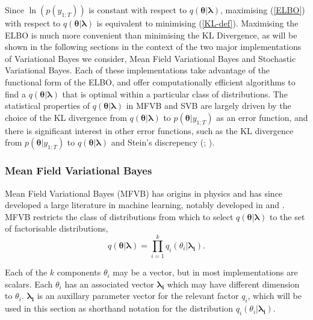 \documentclass[12pt,a4paper]{article}%
\numberwithin{equation}{section}
\begin{document}
Since $\ln(p(y_{1:T}))$ is constant with respect to $q(\boldsymbol{\theta} | \boldsymbol{\lambda})$, maximising (\ref{ELBO}) with respect to $q(\boldsymbol{\theta} | \boldsymbol{\lambda})$ is equivalent to minimising (\ref{KL-def}). Maximising the ELBO is much more convenient than minimising the KL Divergence, as will be shown in the following sections in the context of the two major implementations of Variational Bayes we consider, Mean Field Variational Bayes and Stochastic Variational Bayes. Each of these implementations take advantage of the functional form of the ELBO, and offer computationally efficient algorithms to find a $q(\boldsymbol{\theta} | \boldsymbol{\lambda})$ that is optimal within a particular class of distributions. The statistical properties of $q(\boldsymbol{\theta} | \boldsymbol{\lambda})$ in MFVB and SVB are largely driven by the choice of the KL divergence from $q(\boldsymbol{\theta} | \boldsymbol{\lambda})$ to $p(\boldsymbol{\theta} | y_{1:T})$ as an error function, and there is significant interest in other error functions, such as the KL divergence from $p(\boldsymbol{\theta} | y_{1:T})$ to $q(\boldsymbol{\theta} | \boldsymbol{\lambda})$ \citep{Minka2001} and Stein's discrepency (\citealp{Liu2016}; \citealp{Ranganath2016b}).

\subsubsection{Mean Field Variational Bayes} \label{sec:mfvb}

Mean Field Variational Bayes (MFVB) has origins in physics \citep{Peterson1987} and has since developed a large literature in machine learning, notably developed in \citet{Jordan1999} and \citet{Ghahramani2000}. MFVB restricts the class of distributions from which to select $q(\boldsymbol{\theta} | \boldsymbol{\lambda})$ to the set of factorisable distributions,
\begin{equation}
\label{mf1}
q(\boldsymbol{\theta} | \boldsymbol{\lambda}) = \prod_{i=1}^k q_i(\theta_i | \boldsymbol{\lambda_i}).
\end{equation}

Each of the $k$ components $\theta_i$ may be a vector, but in most implementations are scalars. Each $\theta_i$ has an associated vector $\boldsymbol{\lambda_i}$ which may have different dimension to $\theta_i$. $\boldsymbol{\lambda_i}$ is an auxillary parameter vector for the relevant factor $q_i$, which will be used in this section as shorthand notation for the distribution $q_i(\theta_i |\boldsymbol{\lambda_i})$. 
\end{document}
